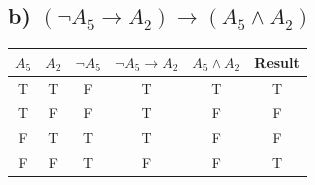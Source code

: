 \documentclass[12pt]{article}
\newcommand{\T}{\cellcolor{truegreen}T}
\newcommand{\F}{\cellcolor{falsered}F}
\begin{document}
\subsection*{b) $(\neg A_5\to A_2)\to(A_5\wedge A_2)$}
\begin{center}
\renewcommand{\arraystretch}{1.15}
\begin{tabular}{|c|c|c|c|c||c|}
\hline
$A_5$ & $A_2$ & $\neg A_5$ & $\neg A_5\to A_2$ & $A_5\wedge A_2$ & \textbf{Result} \\ \hline
\T & \T & \F & \T & \T & \T \\
\T & \F & \F & \T & \F & \F \\
\F & \T & \T & \T & \F & \F \\
\F & \F & \T & \F & \F & \T \\
\hline
\end{tabular}
\end{center}
 
\newpage
\end{document}
